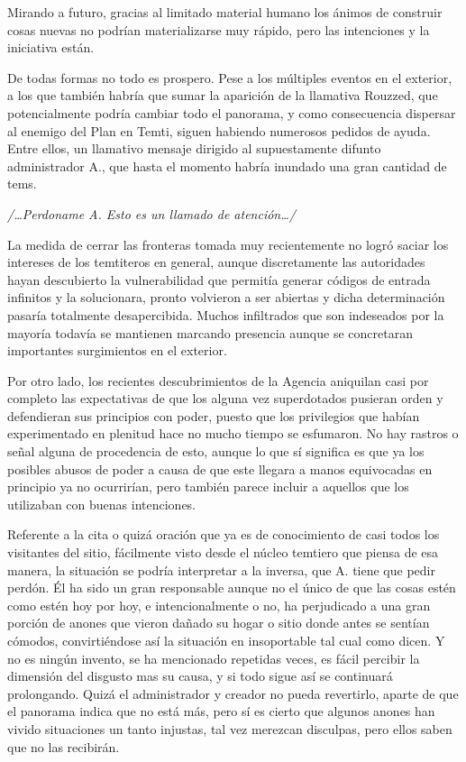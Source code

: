 \documentclass[
  spanish,
]{book}
\begin{document}
Mirando a futuro, gracias al limitado material humano los ánimos de construir cosas nuevas no podrían materializarse muy rápido, pero las intenciones y la iniciativa están.

De todas formas no todo es prospero. Pese a los múltiples eventos en el exterior, a los que también habría que sumar la aparición de la llamativa Rouzzed, que potencialmente podría cambiar todo el panorama, y como consecuencia dispersar al enemigo del Plan en Temti, siguen habiendo numerosos pedidos de ayuda. Entre ellos, un llamativo mensaje dirigido al supuestamente difunto administrador A., que hasta el momento habría inundado una gran cantidad de tems.

\emph{/\ldots Perdoname A. Esto es un llamado de atención\ldots/}

La medida de cerrar las fronteras tomada muy recientemente no logró saciar los intereses de los temtiteros en general, aunque discretamente las autoridades hayan descubierto la vulnerabilidad que permitía generar códigos de entrada infinitos y la solucionara, pronto volvieron a ser abiertas y dicha determinación pasaría totalmente desapercibida. Muchos infiltrados que son indeseados por la mayoría todavía se mantienen marcando presencia aunque se concretaran importantes surgimientos en el exterior.

Por otro lado, los recientes descubrimientos de la Agencia aniquilan casi por completo las expectativas de que los alguna vez superdotados pusieran orden y defendieran sus principios con poder, puesto que los privilegios que habían experimentado en plenitud hace no mucho tiempo se esfumaron. No hay rastros o señal alguna de procedencia de esto, aunque lo que sí significa es que ya los posibles abusos de poder a causa de que este llegara a manos equivocadas en principio ya no ocurrirían, pero también parece incluir a aquellos que los utilizaban con buenas intenciones.

Referente a la cita o quizá oración que ya es de conocimiento de casi todos los visitantes del sitio, fácilmente visto desde el núcleo temtiero que piensa de esa manera, la situación se podría interpretar a la inversa, que A. tiene que pedir perdón. Él ha sido un gran responsable aunque no el único de que las cosas estén como estén hoy por hoy, e intencionalmente o no, ha perjudicado a una gran porción de anones que vieron dañado su hogar o sitio donde antes se sentían cómodos, convirtiéndose así la situación en insoportable tal cual como dicen. Y no es ningún invento, se ha mencionado repetidas veces, es fácil percibir la dimensión del disgusto mas su causa, y si todo sigue así se continuará prolongando. Quizá el administrador y creador no pueda revertirlo, aparte de que el panorama indica que no está más, pero sí es cierto que algunos anones han vivido situaciones un tanto injustas, tal vez merezcan disculpas, pero ellos saben que no las recibirán.
\end{document}
